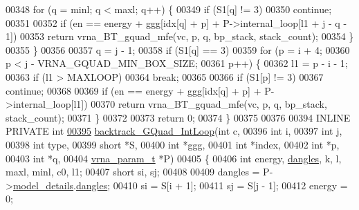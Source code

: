 \begin{DoxyCode}
00348     \textcolor{keywordflow}{for} (q = minl; q < maxl; q++) \{
00349       \textcolor{keywordflow}{if} (S1[q] != 3)
00350         \textcolor{keywordflow}{continue};
00351 
00352       \textcolor{keywordflow}{if} (en == energy + ggg[idx[q] + p] + P->internal\_loop[l1 + j - q - 1])
00353         \textcolor{keywordflow}{return} vrna\_BT\_gquad\_mfe(vc, p, q, bp\_stack, stack\_count);
00354     \}
00355   \}
00356 
00357   q = j - 1;
00358   \textcolor{keywordflow}{if} (S1[q] == 3)
00359     \textcolor{keywordflow}{for} (p = i + 4;
00360          p < j - VRNA\_GQUAD\_MIN\_BOX\_SIZE;
00361          p++) \{
00362       l1 = p - i - 1;
00363       \textcolor{keywordflow}{if} (l1 > MAXLOOP)
00364         \textcolor{keywordflow}{break};
00365 
00366       \textcolor{keywordflow}{if} (S1[p] != 3)
00367         \textcolor{keywordflow}{continue};
00368 
00369       \textcolor{keywordflow}{if} (en == energy + ggg[idx[q] + p] + P->internal\_loop[l1])
00370         \textcolor{keywordflow}{return} vrna\_BT\_gquad\_mfe(vc, p, q, bp\_stack, stack\_count);
00371     \}
00372 
00373   \textcolor{keywordflow}{return} 0;
00374 \}
00375 
00376 
00394 INLINE PRIVATE \textcolor{keywordtype}{int}
\hyperlink{group__gquads_ga220c41e8dbcee940ac975b8ce88e55c5}{00395} \hyperlink{group__gquads_ga220c41e8dbcee940ac975b8ce88e55c5}{backtrack\_GQuad\_IntLoop}(\textcolor{keywordtype}{int}           c,
00396                         \textcolor{keywordtype}{int}           i,
00397                         \textcolor{keywordtype}{int}           j,
00398                         \textcolor{keywordtype}{int}           type,
00399                         \textcolor{keywordtype}{short}         *S,
00400                         \textcolor{keywordtype}{int}           *ggg,
00401                         \textcolor{keywordtype}{int}           *index,
00402                         \textcolor{keywordtype}{int}           *p,
00403                         \textcolor{keywordtype}{int}           *q,
00404                         \hyperlink{group__energy__parameters_structvrna__param__s}{vrna\_param\_t}  *P)
00405 \{
00406   \textcolor{keywordtype}{int}   energy, \hyperlink{group__model__details_ga72b511ed1201f7e23ec437e468790d74}{dangles}, k, l, maxl, minl, c0, l1;
00407   \textcolor{keywordtype}{short} si, sj;
00408 
00409   dangles = P->\hyperlink{group__energy__parameters_a7b84353eb9075c595bad4ceb871bcae7}{model\_details}.\hyperlink{group__model__details_adcda4ff2ea77748ae0e8700288282efc}{dangles};
00410   si      = S[i + 1];
00411   sj      = S[j - 1];
00412   energy  = 0;

\end{DoxyCode}
